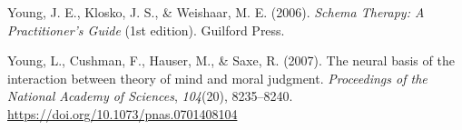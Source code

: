\documentclass[
  donotrepeattitle,doc, 12pt, a4paper,floatsintext]{apa7}
\newlength{\cslhangindent}
\newlength{\cslentryspacingunit} %
\newenvironment{CSLReferences}[2] %
 {%
  \setlength{\parindent}{0pt}
  \ifodd #1
  \let\oldpar\par
  \def\par{\hangindent=\cslhangindent\oldpar}
  \fi
  \setlength{\parskip}{#2\cslentryspacingunit}
 }%
 {}
\begin{document}
\begin{CSLReferences}{1}{0}
\leavevmode{}%
Young, J. E., Klosko, J. S., \& Weishaar, M. E. (2006). \emph{Schema Therapy: A Practitioner's Guide} (1st edition). Guilford Press.

\leavevmode{}%
Young, L., Cushman, F., Hauser, M., \& Saxe, R. (2007). The neural basis of the interaction between theory of mind and moral judgment. \emph{Proceedings of the National Academy of Sciences}, \emph{104}(20), 8235--8240. \url{https://doi.org/10.1073/pnas.0701408104}

\end{CSLReferences}

\endgroup

\newpage
\end{document}
